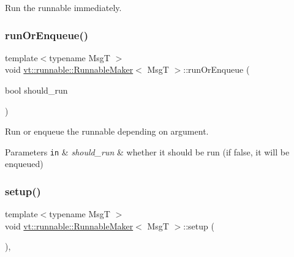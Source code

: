 Run the runnable immediately. 

\mbox{\label{structvt_1_1runnable_1_1_runnable_maker_aa0ae94d80e43385c18ee1e2afbce59a2}} 
\subsubsection{\texorpdfstring{run\+Or\+Enqueue()}{runOrEnqueue()}}
{\footnotesize\ttfamily template$<$typename MsgT $>$ \\
void \hyperlink{structvt_1_1runnable_1_1_runnable_maker}{vt\+::runnable\+::\+Runnable\+Maker}$<$ MsgT $>$\+::run\+Or\+Enqueue (\begin{DoxyParamCaption}\item[{bool}]{should\+\_\+run }\end{DoxyParamCaption})\hspace{0.3cm}{\ttfamily [inline]}}



Run or enqueue the runnable depending on argument. 


\begin{DoxyParams}[1]{Parameters}
\mbox{\tt in}  & {\em should\+\_\+run} & whether it should be run (if false, it will be enqueued) \\
\hline
\end{DoxyParams}
\mbox{\label{structvt_1_1runnable_1_1_runnable_maker_add114dad8a3f0769bed8b8396ba9a13a}} 
\subsubsection{\texorpdfstring{setup()}{setup()}}
{\footnotesize\ttfamily template$<$typename MsgT $>$ \\
void \hyperlink{structvt_1_1runnable_1_1_runnable_maker}{vt\+::runnable\+::\+Runnable\+Maker}$<$ MsgT $>$\+::setup (\begin{DoxyParamCaption}{ }\end{DoxyParamCaption})\hspace{0.3cm}{\ttfamily [inline]}, {\ttfamily [private]}}



